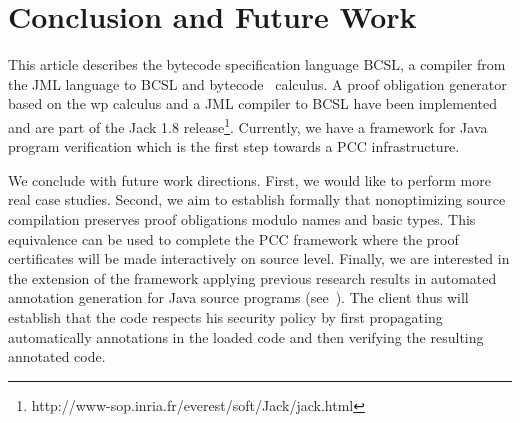 \section{Conclusion and Future Work}\label{conclusion}
This article describes the bytecode specification language BCSL, a compiler from the JML language to BCSL and bytecode \wpi \ calculus.
A proof obligation generator based on the wp calculus and a JML compiler to BCSL have been implemented and are part of the Jack 1.8 release\footnote{http://www-sop.inria.fr/everest/soft/Jack/jack.html}.
Currently, we have a framework for Java program verification which is the first step towards a PCC infrastructure.

 We conclude with future work directions. 
First, we would like to perform more real case studies. Second, we aim to establish formally that nonoptimizing source compilation
preserves proof obligations modulo names and basic types. This equivalence can
 be used to complete the PCC framework where the proof certificates will be made interactively on source level. Finally, we are interested in 
the extension of the framework applying previous research results in automated annotation generation for Java source programs
 (see~\cite{PBBHL}). The client thus will establish that the code respects his security policy %
by first propagating automatically annotations in the loaded code and then verifying the resulting annotated code.





